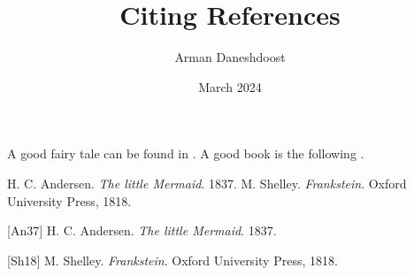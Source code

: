 \documentclass{article}
\title{Citing References}
\author{Arman Daneshdoost}
\date{March 2024}
\begin{document}
	\maketitle
	A good fairy tale can be found in \cite{andersen}. 
	A good book is the following \cite{shelley}.
	
	\cite[p.~37]{shelley} %
	\cite{shelley, andersen} %
	
	\vspace{1cm}
	\begin{thebibliography}{2} %
		H. C. Andersen. \textit{The little Mermaid}. 1837.
		M. Shelley. \textit{Frankstein}. Oxford University Press, 1818.
	\end{thebibliography}
		
		[An37] H. C. Andersen. \textit{The little Mermaid}. 1837. %
		
		[Sh18] M. Shelley. \textit{Frankstein}. Oxford University Press, 1818. %
\end{document}
